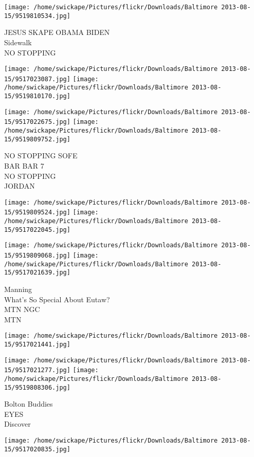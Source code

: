 \documentclass[10pt,letterpaper]{article}
\begin{document}
\vspace{0.25in}
\texttt{[image: /home/swickape/Pictures/flickr/Downloads/Baltimore 2013-08-15/9519810534.jpg]}

JESUS SKAPE OBAMA BIDEN\\
Sidewalk\\
NO STOPPING
\pagebreak

\texttt{[image: /home/swickape/Pictures/flickr/Downloads/Baltimore 2013-08-15/9517023087.jpg]}
\texttt{[image: /home/swickape/Pictures/flickr/Downloads/Baltimore 2013-08-15/9519810170.jpg]}

\texttt{[image: /home/swickape/Pictures/flickr/Downloads/Baltimore 2013-08-15/9517022675.jpg]}
\texttt{[image: /home/swickape/Pictures/flickr/Downloads/Baltimore 2013-08-15/9519809752.jpg]}

NO STOPPING SOFE\\
BAR BAR 7\\
NO STOPPING\\
JORDAN
\pagebreak

\texttt{[image: /home/swickape/Pictures/flickr/Downloads/Baltimore 2013-08-15/9519809524.jpg]}
\texttt{[image: /home/swickape/Pictures/flickr/Downloads/Baltimore 2013-08-15/9517022045.jpg]}

\texttt{[image: /home/swickape/Pictures/flickr/Downloads/Baltimore 2013-08-15/9519809068.jpg]}
\texttt{[image: /home/swickape/Pictures/flickr/Downloads/Baltimore 2013-08-15/9517021639.jpg]}

Manning\\
What's So Special About Eutaw?\\
MTN NGC\\
MTN
\pagebreak

\texttt{[image: /home/swickape/Pictures/flickr/Downloads/Baltimore 2013-08-15/9517021441.jpg]}

\vspace{0.25in}
\texttt{[image: /home/swickape/Pictures/flickr/Downloads/Baltimore 2013-08-15/9517021277.jpg]}
\texttt{[image: /home/swickape/Pictures/flickr/Downloads/Baltimore 2013-08-15/9519808306.jpg]}

Bolton Buddies\\
EYES\\
Discover
\pagebreak

\texttt{[image: /home/swickape/Pictures/flickr/Downloads/Baltimore 2013-08-15/9517020835.jpg]}
\end{document}
